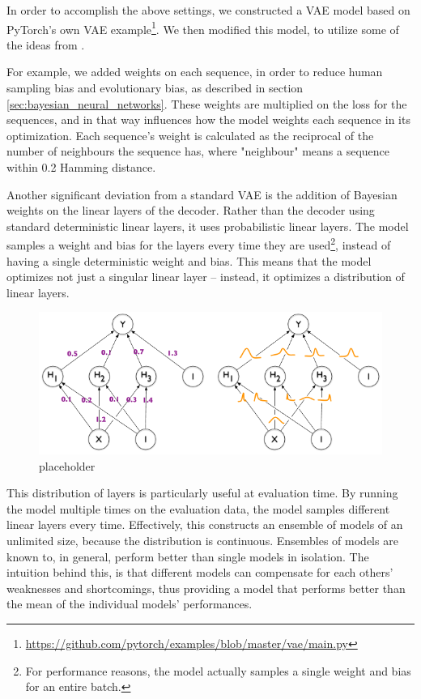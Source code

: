 In order to accomplish the above settings, we constructed a VAE model based on PyTorch's own VAE example\footnote{\url{https://github.com/pytorch/examples/blob/master/vae/main.py}}. We then modified this model, to utilize some of the ideas from \cite{riesselman2018deep}.

For example, we added weights on each sequence, in order to reduce human sampling bias and evolutionary bias, as described in section \ref{sec:bayesian_neural_networks}. These weights are multiplied on the loss for the sequences, and in that way influences how the model weights each sequence in its optimization. Each sequence's weight is calculated as the reciprocal of the number of neighbours the sequence has, where "neighbour" means a sequence within 0.2 Hamming distance.


Another significant deviation from a standard VAE is the addition of Bayesian weights on the linear layers of the decoder. Rather than the decoder using standard deterministic linear layers, it uses probabilistic linear layers. The model samples a weight and bias for the layers every time they are used\footnote{For performance reasons, the model actually samples a single weight and bias for an entire batch.}, instead of having a single deterministic weight and bias. This means that the model optimizes not just a singular linear layer -- instead, it optimizes a distribution of linear layers.

\begin{figure}[ht]
    \centering
    \includegraphics[width = \linewidth]{report/figures/placeholder.png}
    \caption{placeholder }
\end{figure}

This distribution of layers is particularly useful at evaluation time. By running the model multiple times on the evaluation data, the model samples different linear layers every time. Effectively, this constructs an ensemble of models of an unlimited size, because the distribution is continuous. Ensembles of models are known to, in general, perform better than single models in isolation. The intuition behind this, is that different models can compensate for each others' weaknesses and shortcomings, thus providing a model that performs better than the mean of the individual models' performances.

